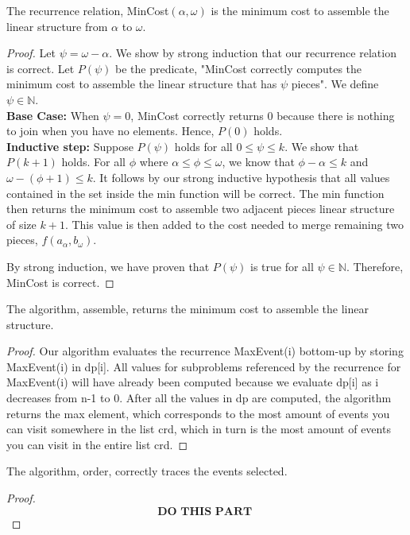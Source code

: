 \documentclass[11pt]{scrartcl}
\begin{document}
\begin{theorem*}
	The recurrence relation, MinCost$(\alpha,\omega)$ is the minimum cost to assemble the linear structure from $\alpha$ to $\omega$.
	\begin{proof}
		Let $\psi = \omega - \alpha$.
		We show by strong induction that our recurrence relation is correct. Let $P(\psi)$ be the predicate,
		"MinCost correctly computes the minimum cost to assemble the linear structure that has $\psi$ pieces".
		We define $\psi \in \mathbb{N}$. \\
		\textbf{Base Case:} When $\psi = 0$, MinCost correctly returns 0 because there is 
		nothing to join when you have no elements. Hence, $P(0)$ holds.\\
		\textbf{Inductive step:} Suppose $P(\psi)$ holds for all $0 \leq \psi \leq k$. We show that $P(k + 1)$ holds. 
		For all $\phi$ where $\alpha \leq \phi \leq \omega$, we know that $\phi - \alpha \leq k$ and $\omega - (\phi + 1) \leq k$.
		It follows by our strong inductive hypothesis that all values contained in the set inside the min function will be correct.
		The min function then returns the minimum cost to assemble two adjacent pieces linear structure of size $k + 1$.
		This value is then added to the cost needed to merge remaining two pieces, $f(a_\alpha,b_\omega)$.
		\par By strong induction, we have proven that $P(\psi)$ is true for all $\psi  \in \mathbb{N}$.
		Therefore, MinCost is correct.
	\end{proof}
\end{theorem*}

\begin{theorem*}
	The algorithm, assemble, returns the minimum cost to assemble the linear structure.

	\begin{proof}
		Our algorithm evaluates the recurrence MaxEvent(i) bottom-up by storing MaxEvent(i) in dp[i].
		All values for subproblems referenced by the recurrence for MaxEvent(i) will have already been computed
		because we evaluate dp[i] as i decreases from n-1 to 0.
		After all the values in dp are computed, the algorithm returns the max element,
		which corresponds to the most amount of events you can visit somewhere in the list crd,
		which in turn is the most amount of events you can visit in the entire list crd.
	\end{proof}

\end{theorem*}

\begin{corollary*}
	The algorithm, order, correctly traces the events selected.
	\begin{proof}
		$$\textbf{DO THIS PART }$$
	\end{proof}
\end{corollary*}
\end{document}
